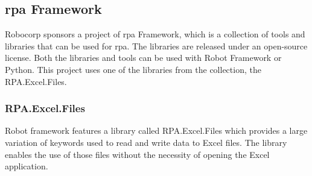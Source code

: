 \subsection{\gls{rpa} Framework}
Robocorp sponsors a  project of \gls{rpa} Framework, which is a collection of tools and libraries that can be used for \gls{rpa}.
The libraries are released under an open-source license.
Both the libraries and tools can be used with Robot Framework or Python.
This project uses one of the libraries from the collection, the RPA.Excel.Files.
\subsubsection{RPA.Excel.Files}
Robot framework features a library called RPA.Excel.Files which provides a large variation of keywords used to read and write data to Excel files.
The library enables the use of those files without the necessity of opening the Excel application.
\cite{robot-framework:standard-library}
\cite{robot_framework:builtin_library}
\cite{robot_framework:dialogs_library}
\cite{robot_framework:browser_library}
\cite{rpa_framework:excel_files}
\clearpage %
